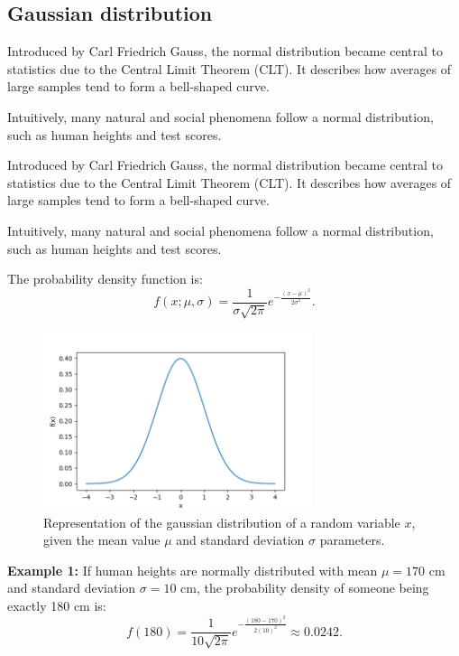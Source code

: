 \documentclass{book}
\begin{document}
\newpage
\subsection{Gaussian distribution}
Introduced by Carl Friedrich Gauss, the normal distribution became central to statistics due to the Central Limit Theorem (CLT). It describes how averages of large samples tend to form a bell-shaped curve.

Intuitively, many natural and social phenomena follow a normal distribution, such as human heights and test scores.

Introduced by Carl Friedrich Gauss, the normal distribution became central to statistics due to the Central Limit Theorem (CLT). It describes how averages of large samples tend to form a bell-shaped curve.

Intuitively, many natural and social phenomena follow a normal distribution, such as human heights and test scores.

The probability density function is:
\begin{equation}
    f(x; \mu, \sigma) = \frac{1}{\sigma \sqrt{2\pi}} e^{-\frac{(x-\mu)^2}{2\sigma^2}}.
\end{equation}

\begin{figure}[ht]
    \centering
    \includegraphics[width=0.7\textwidth]{figures/chapter2/normal.png}
    \caption{Representation of the gaussian distribution of a random variable $x$, given the mean value $\mu$ and standard deviation $\sigma$ parameters.}
    \label{fig:random}
\end{figure}

\textbf{Example 1:} If human heights are normally distributed with mean $\mu=170$ cm and standard deviation $\sigma=10$ cm, the probability density of someone being exactly 180 cm is:
\begin{equation}
    f(180) = \frac{1}{10 \sqrt{2\pi}} e^{-\frac{(180-170)^2}{2(10)^2}} \approx 0.0242.
\end{equation}
\end{document}
